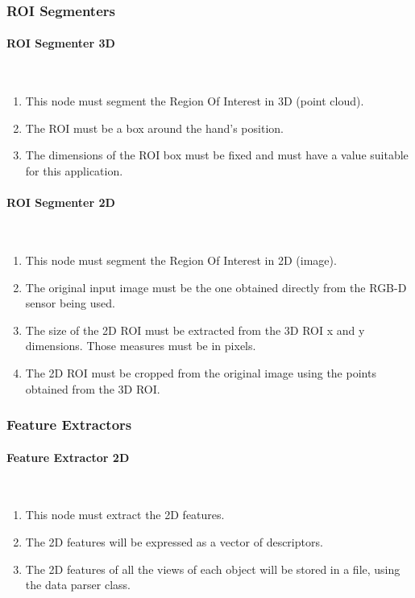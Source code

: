\subsubsection{ROI Segmenters}

   \paragraph{ROI Segmenter 3D}\mbox{}\\
   \begin{enumerate}[label=\textbf{FR\threedigits*}, leftmargin=2cm]
  \setcounter{enumi}{\value{saveenum}}
	\item This node must segment the Region Of Interest in 3D (point cloud). 
	\item The ROI must be a box around the hand's position. 
	\item The dimensions of the ROI box must be fixed and must have a value suitable for this application.  
   \setcounter{saveenum}{\value{enumi}}
\end{enumerate}

   \paragraph{ROI Segmenter 2D}\mbox{}\\
   \begin{enumerate}[label=\textbf{FR\threedigits*}, leftmargin=2cm]
  \setcounter{enumi}{\value{saveenum}}
   	\item This node must segment the Region Of Interest in 2D (image).
   	\item The original input image must be the one obtained directly from the RGB-D sensor being used.
   	\item The size of the 2D ROI must be extracted from the 3D ROI x and y dimensions. Those measures must be in pixels. 
	\item The 2D ROI must be cropped from the original image using the points obtained from the 3D ROI. 
   \setcounter{saveenum}{\value{enumi}}
\end{enumerate}

\subsubsection{Feature Extractors}

   \paragraph{Feature Extractor 2D}\mbox{}\\
      \begin{enumerate}[label=\textbf{FR\threedigits*}, leftmargin=2cm]
  \setcounter{enumi}{\value{saveenum}}
	\item This node must extract the 2D features. 
	\item The 2D features will be expressed as a vector of descriptors. %
	\item The 2D features of all the views of each object will be stored in a file, using the data parser class.  
     \setcounter{saveenum}{\value{enumi}}
\end{enumerate}

